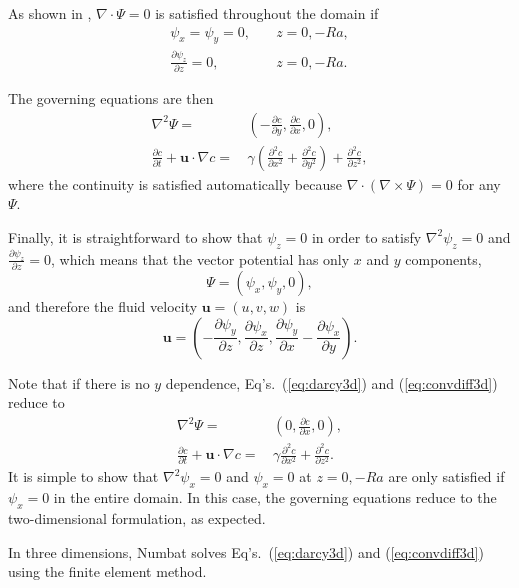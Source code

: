 \documentclass[11pt, a4paper]{csiroreport2012}
\begin{document}
As shown in \cite{E1997}, $\nabla \cdot \Psi = 0$ is satisfied throughout the domain if 
\begin{align}
\psi_x = \psi_y = 0,& \quad z = 0, -Ra, \nonumber \\
\frac{\partial \psi_z}{\partial z} = 0, & \quad  z = 0, -Ra.
\end{align}

The governing equations are then 
\begin{align}
\nabla^2 \Psi = \,& \left(-\frac{\partial c}{\partial y}, \frac{\partial c}{\partial x}, 0 \right), \label{eq:darcy3d} \\
\frac{\partial c}{\partial t} + \mathbf{u} \cdot \nabla c = \, & \gamma \left( \frac{\partial^2 c}{\partial x^2} + \frac{\partial^2 c}{\partial y^2} \right) + \frac{\partial^2 c}{\partial z^2}, \label{eq:convdiff3d}
\end{align}
where the continuity is satisfied automatically because $\nabla \cdot \left( \nabla \times \Psi \right) = 0$ for any $\Psi$.

Finally, it is straightforward to show that $\psi_z = 0$ in order to satisfy $\nabla^2 \psi_z = 0$ and $\frac{\partial \psi_z}{\partial z} = 0$, which means that the vector potential has only $x$ and $y$ components, 
\begin{equation}
\Psi = (\psi_x, \psi_y, 0),
\end{equation}
and therefore the fluid velocity $\mathbf{u} = (u, v, w)$ is
\begin{equation}
\mathbf{u} = \left( -\frac{\partial \psi_y}{\partial z}, \frac{\partial \psi_x}{\partial z}, \frac{\partial \psi_y}{\partial x} - \frac{\partial \psi_x}{\partial y} \right).
\end{equation}

Note that if there is no $y$ dependence, Eq's.~(\ref{eq:darcy3d}) and (\ref{eq:convdiff3d}) reduce to 
\begin{align}
\nabla^2 \Psi = \, & \left(0, \frac{\partial c}{\partial x}, 0 \right), \\
\frac{\partial c}{\partial t} + \mathbf{u} \cdot \nabla c = \, & \gamma \frac{\partial^2 c}{\partial x^2}  + \frac{\partial^2 c}{\partial z^2}.
\end{align}
It is simple to show that $\nabla^2 \psi_x = 0$ and $\psi_x = 0$ at $z = 0, -Ra$ are only satisfied if $\psi_x = 0$ in the entire domain. In this case, the governing equations reduce to the two-dimensional formulation, as expected.

In three dimensions, Numbat solves Eq's.~(\ref{eq:darcy3d}) and (\ref{eq:convdiff3d}) using the finite element method.
\end{document}

